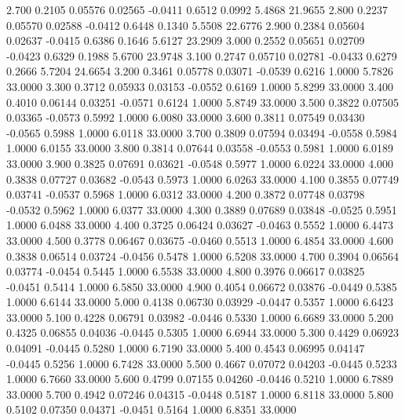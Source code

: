    2.700   0.2105   0.05576   0.02565  -0.0411   0.6512   0.0992   5.4868  21.9655
   2.800   0.2237   0.05570   0.02588  -0.0412   0.6448   0.1340   5.5508  22.6776
   2.900   0.2384   0.05604   0.02637  -0.0415   0.6386   0.1646   5.6127  23.2909
   3.000   0.2552   0.05651   0.02709  -0.0423   0.6329   0.1988   5.6700  23.9748
   3.100   0.2747   0.05710   0.02781  -0.0433   0.6279   0.2666   5.7204  24.6654
   3.200   0.3461   0.05778   0.03071  -0.0539   0.6216   1.0000   5.7826  33.0000
   3.300   0.3712   0.05933   0.03153  -0.0552   0.6169   1.0000   5.8299  33.0000
   3.400   0.4010   0.06144   0.03251  -0.0571   0.6124   1.0000   5.8749  33.0000
   3.500   0.3822   0.07505   0.03365  -0.0573   0.5992   1.0000   6.0080  33.0000
   3.600   0.3811   0.07549   0.03430  -0.0565   0.5988   1.0000   6.0118  33.0000
   3.700   0.3809   0.07594   0.03494  -0.0558   0.5984   1.0000   6.0155  33.0000
   3.800   0.3814   0.07644   0.03558  -0.0553   0.5981   1.0000   6.0189  33.0000
   3.900   0.3825   0.07691   0.03621  -0.0548   0.5977   1.0000   6.0224  33.0000
   4.000   0.3838   0.07727   0.03682  -0.0543   0.5973   1.0000   6.0263  33.0000
   4.100   0.3855   0.07749   0.03741  -0.0537   0.5968   1.0000   6.0312  33.0000
   4.200   0.3872   0.07748   0.03798  -0.0532   0.5962   1.0000   6.0377  33.0000
   4.300   0.3889   0.07689   0.03848  -0.0525   0.5951   1.0000   6.0488  33.0000
   4.400   0.3725   0.06424   0.03627  -0.0463   0.5552   1.0000   6.4473  33.0000
   4.500   0.3778   0.06467   0.03675  -0.0460   0.5513   1.0000   6.4854  33.0000
   4.600   0.3838   0.06514   0.03724  -0.0456   0.5478   1.0000   6.5208  33.0000
   4.700   0.3904   0.06564   0.03774  -0.0454   0.5445   1.0000   6.5538  33.0000
   4.800   0.3976   0.06617   0.03825  -0.0451   0.5414   1.0000   6.5850  33.0000
   4.900   0.4054   0.06672   0.03876  -0.0449   0.5385   1.0000   6.6144  33.0000
   5.000   0.4138   0.06730   0.03929  -0.0447   0.5357   1.0000   6.6423  33.0000
   5.100   0.4228   0.06791   0.03982  -0.0446   0.5330   1.0000   6.6689  33.0000
   5.200   0.4325   0.06855   0.04036  -0.0445   0.5305   1.0000   6.6944  33.0000
   5.300   0.4429   0.06923   0.04091  -0.0445   0.5280   1.0000   6.7190  33.0000
   5.400   0.4543   0.06995   0.04147  -0.0445   0.5256   1.0000   6.7428  33.0000
   5.500   0.4667   0.07072   0.04203  -0.0445   0.5233   1.0000   6.7660  33.0000
   5.600   0.4799   0.07155   0.04260  -0.0446   0.5210   1.0000   6.7889  33.0000
   5.700   0.4942   0.07246   0.04315  -0.0448   0.5187   1.0000   6.8118  33.0000
   5.800   0.5102   0.07350   0.04371  -0.0451   0.5164   1.0000   6.8351  33.0000
